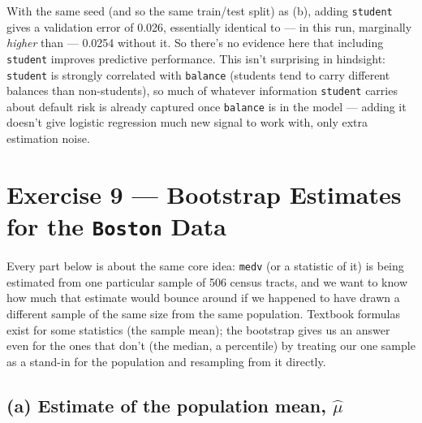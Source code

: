 \documentclass[
  11pt,
]{article}
\newenvironment{Shaded}{\begin{snugshade}}{\end{snugshade}}
\newcommand{\FunctionTok}[1]{\textcolor[rgb]{0.13,0.29,0.53}{\textbf{#1}}}
\newcommand{\NormalTok}[1]{#1}
\newcommand{\OtherTok}[1]{\textcolor[rgb]{0.56,0.35,0.01}{#1}}
\newcommand{\SpecialCharTok}[1]{\textcolor[rgb]{0.81,0.36,0.00}{\textbf{#1}}}
\begin{document}
With the same seed (and so the same train/test split) as (b), adding
\texttt{student} gives a validation error of 0.026, essentially
identical to --- in this run, marginally \emph{higher} than --- 0.0254
without it. So there's no evidence here that including \texttt{student}
improves predictive performance. This isn't surprising in hindsight:
\texttt{student} is strongly correlated with \texttt{balance} (students
tend to carry different balances than non-students), so much of whatever
information \texttt{student} carries about default risk is already
captured once \texttt{balance} is in the model --- adding it doesn't
give logistic regression much new signal to work with, only extra
estimation noise.

\newpage

\section{\texorpdfstring{Exercise 9 --- Bootstrap Estimates for the
\texttt{Boston}
Data}{Exercise 9 --- Bootstrap Estimates for the Boston Data}}\label{exercise-9-bootstrap-estimates-for-the-boston-data}

Every part below is about the same core idea: \texttt{medv} (or a
statistic of it) is being estimated from one particular sample of 506
census tracts, and we want to know how much that estimate would bounce
around if we happened to have drawn a different sample of the same size
from the same population. Textbook formulas exist for some statistics
(the sample mean); the bootstrap gives us an answer even for the ones
that don't (the median, a percentile) by treating our one sample as a
stand-in for the population and resampling from it directly.

\subsection{\texorpdfstring{(a) Estimate of the population mean,
\(\hat\mu\)}{(a) Estimate of the population mean, \textbackslash hat\textbackslash mu}}\label{a-estimate-of-the-population-mean-hatmu}

\begin{Shaded}
\end{Shaded}
\end{document}
